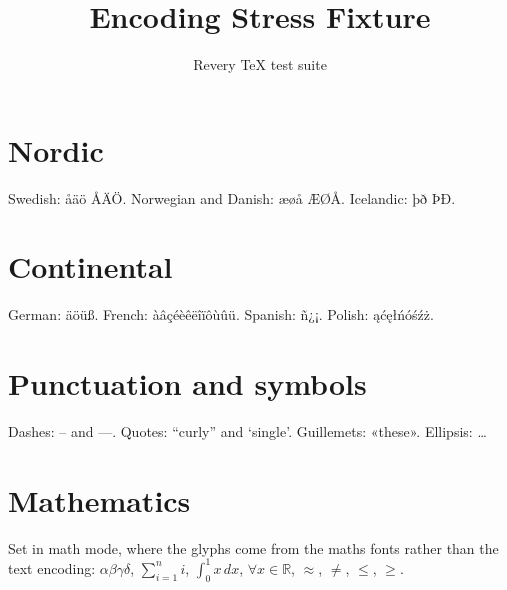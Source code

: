 \documentclass[11pt]{article}
\title{Encoding Stress Fixture}
\author{Revery TeX test suite}
\begin{document}
\maketitle

\section{Nordic}
Swedish: åäö ÅÄÖ. Norwegian and Danish: æøå ÆØÅ. Icelandic: þð ÞÐ.

\section{Continental}
German: äöüß. French: àâçéèêëîïôùûü. Spanish: ñ¿¡. Polish: ąćęłńóśźż.

\section{Punctuation and symbols}
Dashes: -- and ---. Quotes: ``curly'' and `single'.
Guillemets: «these». Ellipsis: \ldots

\section{Mathematics}
Set in math mode, where the glyphs come from the maths fonts rather than the
text encoding: $\alpha\beta\gamma\delta$, $\sum_{i=1}^{n} i$, $\int_0^1 x\,dx$,
$\forall x \in \mathbb{R}$, $\approx$, $\neq$, $\leq$, $\geq$.
\end{document}
